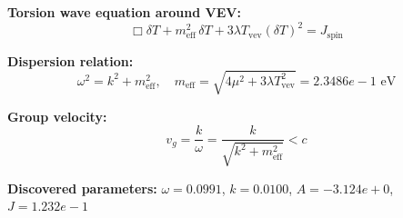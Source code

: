 
\textbf{Torsion wave equation around VEV:}
\begin{equation}
  \Box \delta T + m_{\text{eff}}^2 \, \delta T + 3\lambda T_{\text{vev}} (\delta T)^2 = J_{\text{spin}}
\end{equation}

\textbf{Dispersion relation:}
\begin{equation}
  \omega^2 = k^2 + m_{\text{eff}}^2, \quad
  m_{\text{eff}} = \sqrt{4\mu^2 + 3\lambda T_{\text{vev}}^2} = 2.3486e-1 \text{ eV}
\end{equation}

\textbf{Group velocity:}
\begin{equation}
  v_g = \frac{k}{\omega} = \frac{k}{\sqrt{k^2 + m_{\text{eff}}^2}} < c
\end{equation}

\textbf{Discovered parameters:}
$\omega = 0.0991$, \quad
$k = 0.0100$, \quad
$A = -3.124e+0$, \quad
$J = 1.232e-1$